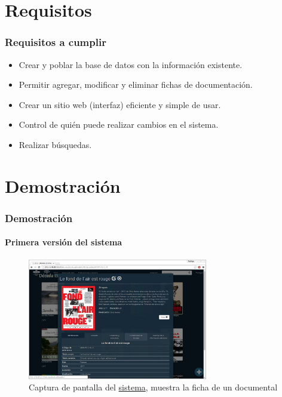 \documentclass{beamer}
\begin{document}
\section{Requisitos}
\begin{frame}
	\frametitle{Requisitos a cumplir}
	
	\begin{itemize}
		\item Crear y poblar la base de datos con la información existente.
		\item Permitir agregar, modificar y eliminar fichas de documentación.
		\item Crear un sitio web (interfaz) eficiente y simple de usar.
		\item Control de quién puede realizar cambios en el sistema.
		\item Realizar búsquedas.
	\end{itemize}
\end{frame}

\section{Demostración}
\begin{frame}
	\frametitle{Demostración}
	\framesubtitle{Primera versión del sistema}
	
	\begin{figure}[H]
		\centering
		\includegraphics[width=0.7\textwidth]{Sistema01.jpg}
		\caption{Captura de pantalla del \href{http://201.148.84.214/lais-audiovisual/public}{sistema}, muestra la ficha de un documental}
		\label{fig:sistema01}
	\end{figure}
\end{frame}
\end{document}

